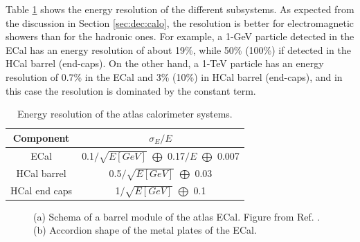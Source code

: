 Table \ref{tab:atlas:cal:reso} shows the energy resolution of the different subsystems. As expected from the discussion in Section \ref{sec:dec:calo}, the resolution is better for electromagnetic showers than for the hadronic ones. For example, a 1-GeV particle detected in the ECal has an energy resolution of about 19\%, while 50\% (100\%) if detected in the HCal barrel (end-caps). On the other hand, a 1-TeV particle has an energy resolution of 0.7\% in the ECal and 3\% (10\%) in  HCal barrel (end-caps), and in this case the resolution is dominated by the constant term.

\begin{table}[ht]
\begin{center}
\begin{tabular}{c c }
\hline
Component & $\sigma_E / E$ \\
\hline 
\hline
ECal & 0.1$/\sqrt{E[GeV]}$ $\bigoplus$ 0.17$/E$ $\bigoplus$ 0.007 \\ %
\hline
HCal barrel & 0.5$/\sqrt{E[GeV]}$ $\bigoplus$ 0.03 \\
\hline
HCal end caps & 1$/\sqrt{E[GeV]}$ $\bigoplus$ 0.1 \\
\hline
\end{tabular}
\end{center}
\caption{Energy resolution of the \gls{atlas} calorimeter systems.}
\label{tab:atlas:cal:reso}
\end{table}

\begin{figure}[ht]
\centering
{}
\caption{(a) Schema of a barrel module of the \gls{atlas} ECal. Figure from Ref. \cite{atlas:atlas}. (b) Accordion shape of the metal plates of the ECal.}
\label{fig:atlas:lar}
\end{figure}

